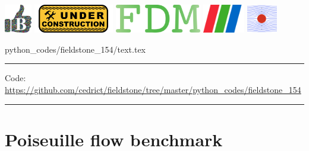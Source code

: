\noindent
\includegraphics[height=1.25cm]{images/pictograms/benchmark}
\includegraphics[height=1.25cm]{images/pictograms/under_construction}
\includegraphics[height=1.25cm]{images/pictograms/FDM}
\includegraphics[height=1.25cm]{images/pictograms/paraview}
\includegraphics[height=1.25cm]{images/pictograms/streamfunction}


\begin{flushright} {\tiny {\color{gray} python\_codes/fieldstone\_154/text.tex}} \end{flushright}

%

\par\noindent\rule{\textwidth}{0.4pt}

\begin{center}
\inpython
{\small Code: \url{https://github.com/cedrict/fieldstone/tree/master/python_codes/fieldstone_154}}
\end{center}

\par\noindent\rule{\textwidth}{0.4pt}



\section*{Poiseuille flow benchmark}

